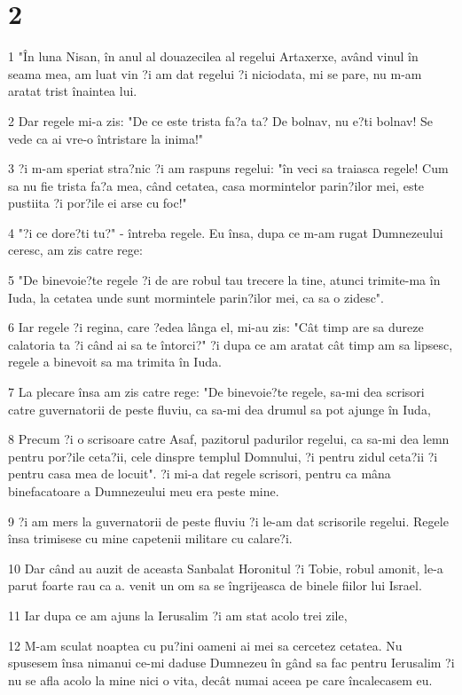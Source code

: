 \chapter{2}

\par 1 "În luna Nisan, în anul al douazecilea al regelui Artaxerxe, având vinul în seama mea, am luat vin ?i am dat regelui ?i niciodata, mi se pare, nu m-am aratat trist înaintea lui.
\par 2 Dar regele mi-a zis: "De ce este trista fa?a ta? De bolnav, nu e?ti bolnav! Se vede ca ai vre-o întristare la inima!"
\par 3 ?i m-am speriat stra?nic ?i am raspuns regelui: "în veci sa traiasca regele! Cum sa nu fie trista fa?a mea, când cetatea, casa mormintelor parin?ilor mei, este pustiita ?i por?ile ei arse cu foc!"
\par 4 "?i ce dore?ti tu?" - întreba regele. Eu însa, dupa ce m-am rugat Dumnezeului ceresc, am zis catre rege:
\par 5 "De binevoie?te regele ?i de are robul tau trecere la tine, atunci trimite-ma în Iuda, la cetatea unde sunt mormintele parin?ilor mei, ca sa o zidesc".
\par 6 Iar regele ?i regina, care ?edea lânga el, mi-au zis: "Cât timp are sa dureze calatoria ta ?i când ai sa te întorci?" ?i dupa ce am aratat cât timp am sa lipsesc, regele a binevoit sa ma trimita în Iuda.
\par 7 La plecare însa am zis catre rege: "De binevoie?te regele, sa-mi dea scrisori catre guvernatorii de peste fluviu, ca sa-mi dea drumul sa pot ajunge în Iuda,
\par 8 Precum ?i o scrisoare catre Asaf, pazitorul padurilor regelui, ca sa-mi dea lemn pentru por?ile ceta?ii, cele dinspre templul Domnului, ?i pentru zidul ceta?ii ?i pentru casa mea de locuit". ?i mi-a dat regele scrisori, pentru ca mâna binefacatoare a Dumnezeului meu era peste mine.
\par 9 ?i am mers la guvernatorii de peste fluviu ?i le-am dat scrisorile regelui. Regele însa trimisese cu mine capetenii militare cu calare?i.
\par 10 Dar când au auzit de aceasta Sanbalat Horonitul ?i Tobie, robul amonit, le-a parut foarte rau ca a. venit un om sa se îngrijeasca de binele fiilor lui Israel.
\par 11 Iar dupa ce am ajuns la Ierusalim ?i am stat acolo trei zile,
\par 12 M-am sculat noaptea cu pu?ini oameni ai mei sa cercetez cetatea. Nu spusesem însa nimanui ce-mi daduse Dumnezeu în gând sa fac pentru Ierusalim ?i nu se afla acolo la mine nici o vita, decât numai aceea pe care încalecasem eu.
